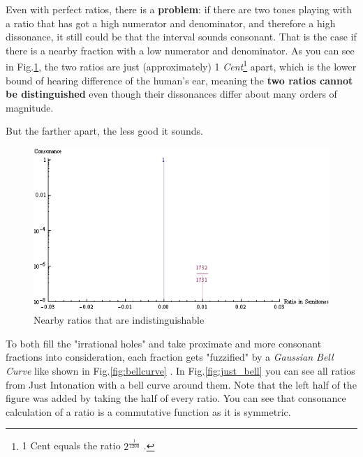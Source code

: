\documentclass[12pt,a4paper,titlepage,oneside]{report}
\begin{document}
Even with perfect ratios, there is a \textbf{problem}: if there are two tones playing with a ratio that has got a high numerator and denominator, and therefore a high dissonance, it still could be that the interval sounds consonant. That is the case if there is a nearby fraction with a low numerator and denominator. As you can see in Fig.\ref{fig:enharmonic}, the two ratios are just (approximately) 1 \textit{Cent}\footnote{1 Cent equals the ratio $2^{\frac{1}{1200}}$ \cite{bib:cent}.} apart, which is the lower bound of hearing difference of the human's ear, meaning the \textbf{two ratios cannot be distinguished} even though their dissonances differ about many orders of magnitude.

\noindent
{}

But the farther apart, the less good it sounds.

\begin{figure}[!ht]
\includegraphics[width=\textwidth]{images/enharmonic.png}
\centering
\caption{Nearby ratios that are indistinguishable}
\label{fig:enharmonic}
\end{figure}

To both fill the "irrational holes" and take proximate and more consonant fractions into consideration, each fraction gets "fuzzified" by a \textit{Gaussian Bell Curve} like shown in Fig.\ref{fig:bellcurve} \cite{bib:bell}. In Fig.\ref{fig:just_bell} you can see all ratios from Just Intonation with a bell curve around them. Note that the left half of the figure was added by taking the half of every ratio. You can see that consonance calculation of a ratio is a commutative function as it is symmetric.
\end{document}
